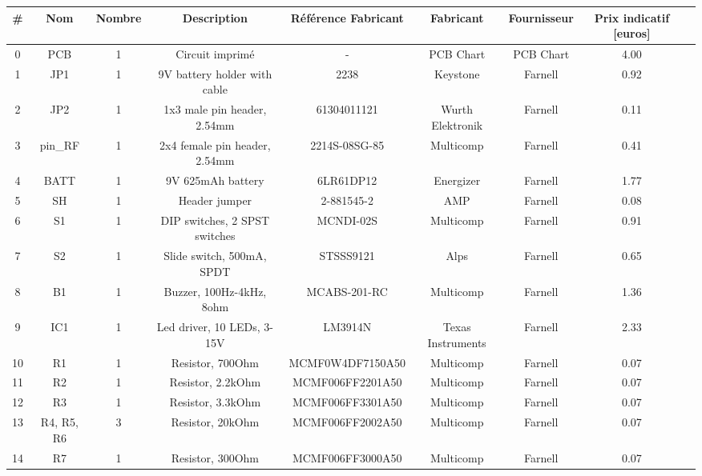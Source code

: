 
\begin{table}[!h]
	\centering
	\small
	\begin{adjustbox}{angle=90}
	\begin{tabular}{|c|c|c|c|c|c|c|c|c|}
		\hline
		\textbf{\#} & \textbf{Nom} & \textbf{Nombre} & \textbf{Description} & \textbf{Référence Fabricant} & \textbf{Fabricant} & \textbf{Fournisseur} & \textbf{Prix indicatif [euros]}\\
		\hline
		\hline
		0 & PCB 		& 1 	& Circuit imprimé 			 & - 				& PCB Chart 		& PCB Chart & 4.00\\
		\hline
		\hline
		1  & JP1    	& 1 	& 9V battery holder with cable 	 & 2238        		& Keystone 			& Farnell 	& 0.92\\
		2  & JP2    	& 1 	& 1x3 male pin header, 2.54mm    & 61304011121 		& Wurth Elektronik 	& Farnell 	& 0.11\\  
		3  & pin\_RF 	& 1 	& 2x4 female pin header, 2.54mm  & 2214S-08SG-85 	& Multicomp 		& Farnell 	& 0.41\\ 
		4  & BATT   	& 1 	& 9V 625mAh battery 			 & 6LR61DP12     	& Energizer 		& Farnell 	& 1.77\\ 
		5  & SH	    	& 1 	& Header jumper					 & 2-881545-2    	& AMP  				& Farnell 	& 0.08\\
		6  & S1	    	& 1 	& DIP switches, 2 SPST switches  & MCNDI-02S 		& Multicomp			& Farnell 	& 0.91\\
		7  & S2     	& 1 	& Slide switch, 500mA, SPDT		 & STSSS9121    	& Alps 				& Farnell 	& 0.65\\
		8  & B1     	& 1 	& Buzzer, 100Hz-4kHz, 8ohm       & MCABS-201-RC  	& Multicomp			& Farnell 	& 1.36\\
		9  & IC1    	& 1 	& Led driver, 10 LEDs, 3-15V     & LM3914N       	& Texas Instruments & Farnell 	& 2.33\\
		10 & R1 		& 1 	& Resistor, 700Ohm               & MCMF0W4DF7150A50 & Multicomp 		& Farnell 	& 0.07\\
		11 & R2 		& 1 	& Resistor, 2.2kOhm              & MCMF006FF2201A50 & Multicomp 		& Farnell 	& 0.07\\
		12 & R3 		& 1 	& Resistor, 3.3kOhm              & MCMF006FF3301A50 & Multicomp 		& Farnell 	& 0.07\\
		13 & R4, R5, R6 & 3 	& Resistor, 20kOhm               & MCMF006FF2002A50 & Multicomp 		& Farnell 	& 0.07\\
		14 & R7 		& 1 	& Resistor, 300Ohm               & MCMF006FF3000A50 & Multicomp 		& Farnell 	& 0.07\\

\end{tabular}
\end{adjustbox}
\end{table}
